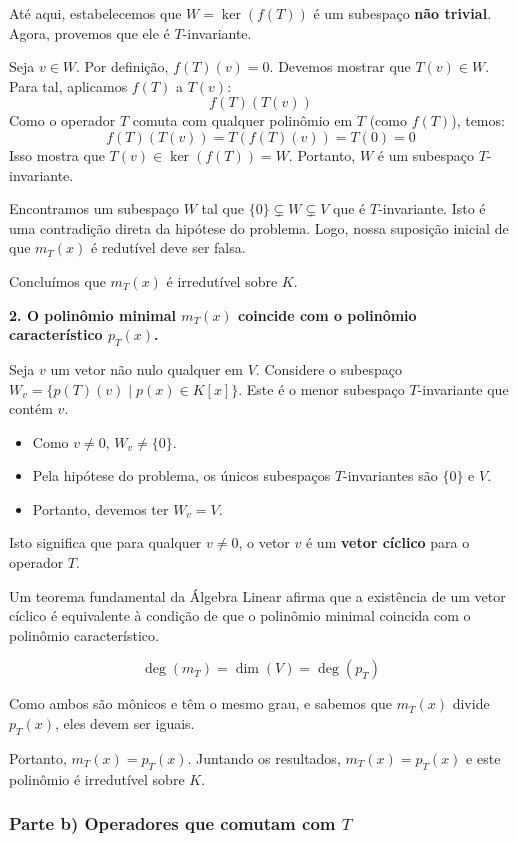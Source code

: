 Até aqui, estabelecemos que $W = \ker(f(T))$ é um subespaço \textbf{não trivial}. Agora, provemos que ele é $T$-invariante.

Seja $v \in W$. Por definição, $f(T)(v) = 0$. Devemos mostrar que $T(v) \in W$. Para tal, aplicamos $f(T)$ a $T(v)$:
\[
f(T)(T(v))
\]
Como o operador $T$ comuta com qualquer polinômio em $T$ (como $f(T)$), temos:
\[
f(T)(T(v)) = T(f(T)(v)) = T(0) = 0
\]
Isso mostra que $T(v) \in \ker(f(T)) = W$. Portanto, $W$ é um subespaço $T$-invariante.

Encontramos um subespaço $W$ tal que $\{0\} \subsetneq W \subsetneq V$ que é $T$-invariante. Isto é uma contradição direta da hipótese do problema. Logo, nossa suposição inicial de que $m_T(x)$ é redutível deve ser falsa.

Concluímos que $m_T(x)$ é irredutível sobre $K$.

\textbf{2. O polinômio minimal $m_T(x)$ coincide com o polinômio característico $p_T(x)$.}

Seja $v$ um vetor não nulo qualquer em $V$. Considere o subespaço $W_v = \{ p(T)(v) \mid p(x) \in K[x]\}$. Este é o menor subespaço $T$-invariante que contém $v$.

\begin{itemize}
    \item Como $v \neq 0$, $W_v \neq \{0\}$.
    \item Pela hipótese do problema, os únicos subespaços $T$-invariantes são $\{0\}$ e $V$.
    \item Portanto, devemos ter $W_v = V$.
\end{itemize}

Isto significa que para qualquer $v \neq 0$, o vetor $v$ é um \textbf{vetor cíclico} para o operador $T$.

Um teorema fundamental da Álgebra Linear afirma que a existência de um vetor cíclico é equivalente à condição de que o polinômio minimal coincida com o polinômio característico.

\[
\deg(m_T) = \dim(V) = \deg(p_T)
\]

Como ambos são mônicos e têm o mesmo grau, e sabemos que $m_T(x)$ divide $p_T(x)$, eles devem ser iguais.

Portanto, $m_T(x) = p_T(x)$. Juntando os resultados, $m_T(x) = p_T(x)$ e este polinômio é irredutível sobre $K$.

\subsubsection*{Parte b) Operadores que comutam com $T$}

